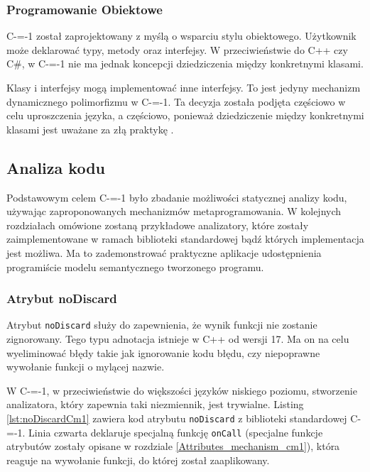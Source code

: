 \subsubsection{Programowanie Obiektowe}
C-=-1 został zaprojektowany z myślą o wsparciu stylu obiektowego. Użytkownik może deklarować typy, metody oraz interfejsy. W przeciwieństwie do C++ czy C\#, w C-=-1 nie ma jednak koncepcji dziedziczenia między konkretnymi klasami.

Klasy i interfejsy mogą implementować inne interfejsy.
To jest jedyny mechanizm dynamicznego polimorfizmu w C-=-1.
Ta decyzja została podjęta częściowo w celu uproszczenia języka, a częściowo, ponieważ dziedziczenie między konkretnymi klasami jest uważane za złą praktykę \cite{gang_of_four:design_patterns}.

\subsection{Analiza kodu}
\label{code_analysis}
Podstawowym celem C-=-1 było zbadanie możliwości statycznej analizy kodu, używając zaproponowanych mechanizmów metaprogramowania.
W kolejnych rozdziałach omówione zostaną przykładowe analizatory, które zostały zaimplementowane w ramach biblioteki standardowej bądź których implementacja jest możliwa.
Ma to zademonstrować praktyczne aplikacje udostępnienia programiście modelu semantycznego tworzonego programu.



\subsubsection{Atrybut noDiscard}
\label{no_discard}

Atrybut \lstinline{noDiscard} służy do zapewnienia, że wynik funkcji nie zostanie zignorowany.
Tego typu adnotacja istnieje w C++ od wersji 17\cite{ISO:cpp17}.
Ma on na celu wyeliminować błędy takie jak ignorowanie kodu błędu, czy niepoprawne wywołanie funkcji o mylącej nazwie.

W C-=-1, w przeciwieństwie do większości języków niskiego poziomu, stworzenie analizatora, który zapewnia taki niezmiennik, jest trywialne.
Listing \ref{lst:noDiscardCm1} zawiera kod atrybutu \lstinline{noDiscard} z biblioteki standardowej C-=-1.
Linia czwarta deklaruje specjalną funkcję \lstinline{onCall} (specjalne funkcje atrybutów zostały opisane w rozdziale \ref{Attributes_mechanism_cm1}), która reaguje na wywołanie funkcji, do której został zaaplikowany.

